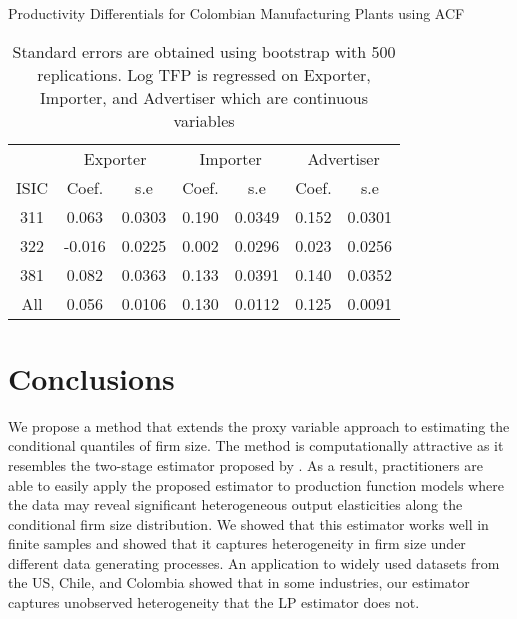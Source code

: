 \documentclass[11pt]{article}
\begin{document}
\begin{table}[H]
\centering
\caption{Productivity Differentials for Colombian Manufacturing Plants using ACF}
\begin{tabular}{ccccccc}
  \hline\hline & \multicolumn{2}{c}{Exporter}  & \multicolumn{2}{c}{Importer} & \multicolumn{2}{c}{Advertiser} \\ \cmidrule(lr){2-3} \cmidrule(lr){4-5} \cmidrule(lr){6-7}ISIC & Coef. & s.e & Coef. & s.e & Coef. & s.e \\ 
  \hline
311 & 0.063 & 0.0303 & 0.190 & 0.0349 & 0.152 & 0.0301 \\ 
  322 & -0.016 & 0.0225 & 0.002 & 0.0296 & 0.023 & 0.0256 \\ 
  381 & 0.082 & 0.0363 & 0.133 & 0.0391 & 0.140 & 0.0352 \\ 
  All & 0.056 & 0.0106 & 0.130 & 0.0112 & 0.125 & 0.0091 \\ 
   \hline
\end{tabular}
\caption*{Standard errors are obtained using bootstrap with 500 replications. Log TFP is regressed on Exporter, Importer, and Advertiser  which are continuous variables }
\end{table}

\section{Conclusions} \label{conclusion}

We propose a method that extends the proxy variable approach to estimating the conditional quantiles of firm size. The method is computationally attractive as it resembles the two-stage estimator proposed by \cite{Canay2011}. As a result, practitioners are able to easily apply the proposed estimator to production function models where the data may reveal significant heterogeneous output elasticities along the conditional firm size distribution. We showed that this estimator works well in finite samples and showed that it captures heterogeneity in firm size under different data generating processes. An application to widely used datasets from the US, Chile, and Colombia showed that in some industries, our estimator captures unobserved heterogeneity that the LP estimator does not.
\end{document}
